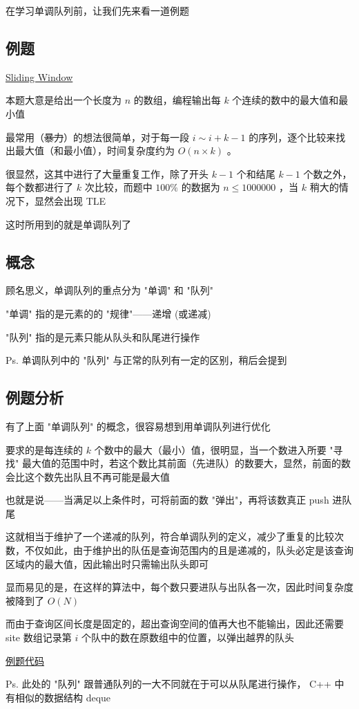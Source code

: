 
在学习单调队列前，让我们先来看一道例题

\subsection{例题}

\href{http://poj.org/problem?id=2823}{Sliding Window}

本题大意是给出一个长度为 $n$ 的数组，编程输出每 $k$ 个连续的数中的最大值和最小值

最常用（\st{暴力}）的想法很简单，对于每一段 $i \sim i+k-1$ 的序列，逐个比较来找出最大值（和最小值），时间复杂度约为 $O(n \times k)$ 。

很显然，这其中进行了大量重复工作，除了开头 $k-1$ 个和结尾 $k-1$ 个数之外，每个数都进行了 $k$ 次比较，而题中 $100\%$ 的数据为 $n \le 1000000$ ，当 $k$ 稍大的情况下，显然会出现 TLE

这时所用到的就是单调队列了

\subsection{概念}

顾名思义，单调队列的重点分为 "单调" 和 "队列"

"单调" 指的是元素的的 "规律"——递增 (或递减)

"队列" 指的是元素只能从队头和队尾进行操作

Ps. 单调队列中的 "队列" 与正常的队列有一定的区别，稍后会提到

\subsection{例题分析}

有了上面 "单调队列" 的概念，很容易想到用单调队列进行优化

要求的是每连续的 $k$ 个数中的最大（最小）值，很明显，当一个数进入所要 "寻找" 最大值的范围中时，若这个数比其前面（先进队）的数要大，显然，前面的数会比这个数先出队且不再可能是最大值

也就是说——当满足以上条件时，可将前面的数 "弹出"，再将该数真正 push 进队尾

这就相当于维护了一个递减的队列，符合单调队列的定义，减少了重复的比较次数，不仅如此，由于维护出的队伍是查询范围内的且是递减的，队头必定是该查询区域内的最大值，因此输出时只需输出队头即可

显而易见的是，在这样的算法中，每个数只要进队与出队各一次，因此时间复杂度被降到了 $O(N)$

而由于查询区间长度是固定的，超出查询空间的值再大也不能输出，因此还需要 site 数组记录第 $i$ 个队中的数在原数组中的位置，以弹出越界的队头

\href{https://www.luogu.org/paste/dze1lw3b}{例题代码}

Ps. 此处的 "队列" 跟普通队列的一大不同就在于可以从队尾进行操作， C++ 中有相似的数据结构 deque
